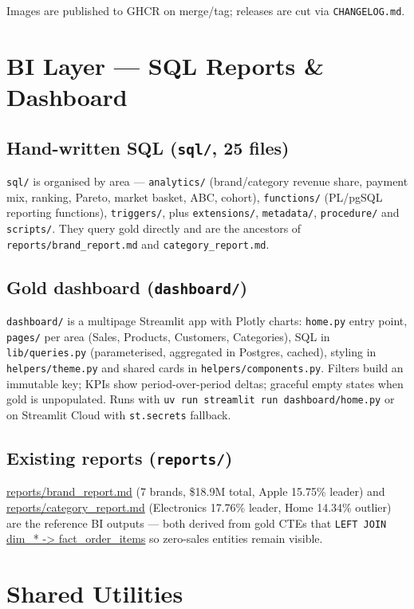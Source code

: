 \documentclass[11pt,a4paper]{article}
\begin{document}
Images are published to GHCR on merge/tag; releases are cut via \texttt{CHANGELOG.md}.

\section{BI Layer — SQL Reports \& Dashboard}

\subsection{Hand-written SQL (\texttt{sql/}, 25 files)}
\texttt{sql/} is organised by area — \texttt{analytics/} (brand/category revenue share, payment mix, ranking, Pareto, market basket, ABC, cohort), \texttt{functions/} (PL/pgSQL reporting functions), \texttt{triggers/}, plus \texttt{extensions/}, \texttt{metadata/}, \texttt{procedure/} and \texttt{scripts/}. They query gold directly and are the ancestors of \texttt{reports/brand\_report.md} and \texttt{category\_report.md}.

\subsection{Gold dashboard (\texttt{dashboard/})}
\texttt{dashboard/} is a multipage Streamlit app with Plotly charts: \texttt{home.py} entry point, \texttt{pages/} per area (Sales, Products, Customers, Categories), SQL in \texttt{lib/queries.py} (parameterised, aggregated in Postgres, cached), styling in \texttt{helpers/theme.py} and shared cards in \texttt{helpers/components.py}. Filters build an immutable key; KPIs show period-over-period deltas; graceful empty states when gold is unpopulated. Runs with \texttt{uv run streamlit run dashboard/home.py} or on Streamlit Cloud with \texttt{st.secrets} fallback.

\subsection{Existing reports (\texttt{reports/})}
\url{reports/brand_report.md} (7 brands, \$18.9M total, Apple 15.75\% leader) and \url{reports/category_report.md} (Electronics 17.76\% leader, Home 14.34\% outlier) are the reference BI outputs — both derived from gold CTEs that \texttt{LEFT JOIN} \url{dim_* -> fact_order_items} so zero-sales entities remain visible.

\section{Shared Utilities}
\end{document}
